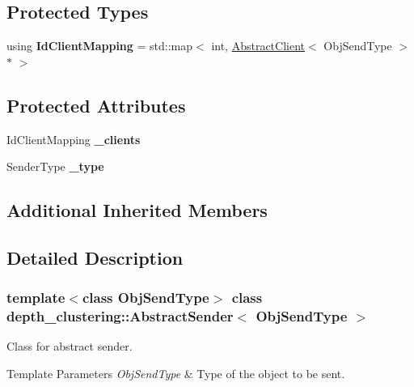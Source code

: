 \subsection*{Protected Types}
\begin{DoxyCompactItemize}
\item 
\mbox{\label{classdepth__clustering_1_1AbstractSender_adc736ec9622d4baf520c8379a23e65ab}} 
using {\bfseries Id\+Client\+Mapping} = std\+::map$<$ int, \hyperlink{classdepth__clustering_1_1AbstractClient}{Abstract\+Client}$<$ Obj\+Send\+Type $>$ $\ast$ $>$
\end{DoxyCompactItemize}
\subsection*{Protected Attributes}
\begin{DoxyCompactItemize}
\item 
\mbox{\label{classdepth__clustering_1_1AbstractSender_a5ef5e33f2a4a2821b2eb4285fe85f80e}} 
Id\+Client\+Mapping {\bfseries \+\_\+clients}
\item 
\mbox{\label{classdepth__clustering_1_1AbstractSender_a9c837623381f9ec0e26130457286af1a}} 
Sender\+Type {\bfseries \+\_\+type}
\end{DoxyCompactItemize}
\subsection*{Additional Inherited Members}


\subsection{Detailed Description}
\subsubsection*{template$<$class Obj\+Send\+Type$>$\newline
class depth\+\_\+clustering\+::\+Abstract\+Sender$<$ Obj\+Send\+Type $>$}

Class for abstract sender. 


\begin{DoxyTemplParams}{Template Parameters}
{\em Obj\+Send\+Type} & Type of the object to be sent. \\
\hline
\end{DoxyTemplParams}


